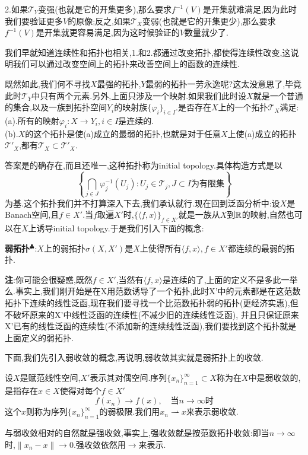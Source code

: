 2.如果$\mathcal{T}_Y$变强(也就是它的开集更多),那么要求$f^{-1}(V)$是开集就难满足,因为此时我们要验证更多$V$的原像;反之,如果$\mathcal{T}_X$变弱(也就是它的开集更少),那么要求$f^{-1}(V)$是开集就更容易满足,因为这时候验证的$V$数量就少了.\par
我们早就知道连续性和拓扑也相关,1.和2.都通过改变拓扑,都使得连续性改变,这说明我们可以通过改变空间上的拓扑来改善空间上的函数的连续性.\par
既然如此,我们何不寻找$X$最强的拓扑,$Y$最弱的拓扑一劳永逸呢?这太没意思了,毕竟此时$\mathcal{T}_Y$中只有两个元素.另外,上面只涉及一个映射.如果我们此时设$X$就是一个普通的集合,以及一族到拓扑空间$Y_i$的映射族$\{\varphi_i\}_{i\in I}$.是否存在$X$上的一个拓扑$\mathcal{T}_X$满足:\\
(a).所有的映射$\varphi _i:X\to Y_i,i\in I$是连续的.\\
(b).$X$的这个拓扑是使(a)成立的最弱的拓扑,也就是对于任意$X$上使(a)成立的拓扑$\mathcal{T}'_X$,都有$\mathcal{T}_X\subset \mathcal{T}'_X$.\par
答案是的确存在,而且还唯一,这种拓扑称为initial topology.具体构造方式是以
$$
\left\{\bigcap_{j\in J}\varphi^{-1}_{j}(U_j):U_j\in\mathcal{T}_j,J\subset I\text{为有限集}\right\}
$$
为基.这个拓扑我们并不打算深入下去,我们承认就行.现在回到泛函分析中:设$X$是Banach空间,且$f\in X'$.当$f$取遍$X'$时,$\{\langle f,x\rangle\}_{f\in X'}$就是一族从$X$到$\mathbb{R}$的映射,自然也可以在$X$上诱导initial topology.于是我们引入下面的概念:\par
\textbf{弱拓扑}$^\clubsuit $:$X$上的弱拓扑$\sigma (X,X')$是$X$上使得所有$\langle f,x\rangle,f\in X'$都连续的最弱的拓扑.\par
\textbf{注}:你可能会很疑惑,既然$f\in X'$,当然有$\langle f,x\rangle$是连续的了,上面的定义不是多此一举么.事实上,我们刚开始是在X用范数诱导了一个拓扑,此时X'中的元素都是在这范数拓扑下连续的线性泛函,现在我们要寻找一个比范数拓扑弱的拓扑(更经济实惠),但不破坏原来的X'中线性泛函的连续性(不减少旧的连续线性泛函),
并且只保证原来X'已有的线性泛函的连续性(不添加新的连续线性泛函),我们要找到这个拓扑就是上面定义的弱拓扑.\par
下面,我们先引入弱收敛的概念,再说明,弱收敛其实就是弱拓扑上的收敛.\par
设$X$是赋范线性空间,$X'$表示其对偶空间.序列$\{x_n\}_{n=1}^{\infty}\subset X$称为在$X$中是弱收敛的,是指存在$x\in X$使得对每个$f\in X'$
$$
f(x_n)\to f(x),\quad \text{当}n\to\infty\text{时}
$$
这个$x$则称为序列$\{x_n\}_{n=1}^{\infty}$的弱极限.我们用$x_n\rightharpoonup x$来表示弱收敛.\par
与弱收敛相对的自然就是强收敛,事实上,强收敛就是按范数拓扑收敛:即当$n\to\infty$时,$\|x_n-x\|\to 0$.强收敛依然用$\to$来表示.\par

